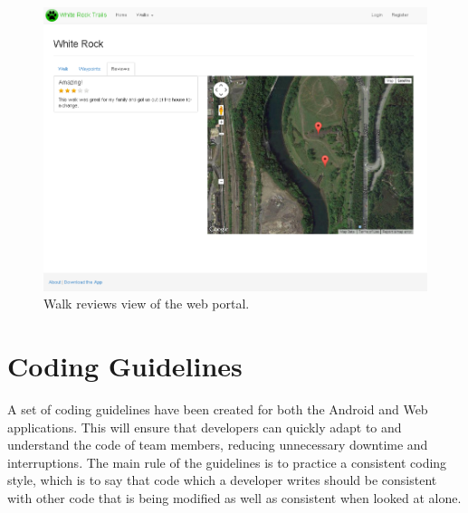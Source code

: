 \documentclass[11pt,a4paper]{article}
\begin{document}
\begin{figure}[H]
\centering
\includegraphics[width=0.8\linewidth]{./img/webportal/walk-reviews}
\caption{Walk reviews view of the web portal.}
\label{fig:walk-reviews}
\end{figure}


\section{Coding Guidelines}
A set of coding guidelines have been created for both the Android and Web applications. This will ensure that developers can quickly adapt to and understand the code of team members, reducing unnecessary downtime and interruptions. The main rule of the guidelines is to practice a consistent coding style, which is to say that code which a developer writes should be consistent with other code that is being modified as well as consistent when looked at alone.
\end{document}
